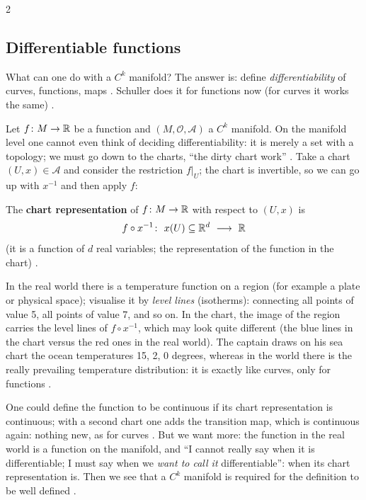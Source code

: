 \begin{paracol}{2}
\subsection{Differentiable functions}\label{ssec:dm-diff-fn}

What can one do with a $C^k$ manifold? The answer is: define \emph{differentiability} of curves, functions, maps
. Schuller does it for functions now (for curves it works the same)
.

Let $f\colon M\to\mathbb{R}$ be a function and $(M,\mathcal O,\mathcal A)$ a $C^k$ manifold. On the manifold level one cannot even
think of deciding differentiability: it is merely a set with a topology; we must go down to the charts, ``the dirty
chart work'' .
Take a chart $(U,x)\in\mathcal A$ and consider the restriction $f|_U$; the chart is invertible, so
we can go up with $x^{-1}$ and then apply $f$:

\begin{definition}\label{def:dm-fnrep}
The \textbf{chart representation} of $f\colon M\to\mathbb{R}$ with respect to $(U,x)$ is
\[
  f\circ x^{-1}\colon\ x(U)\subseteq\R^d\ \longrightarrow\ \R
\]
(it is a function of $d$ real variables; the representation of the function in the chart)
.
\end{definition}
\begin{intuition}
In the real world there is a temperature function on a region (for example a plate or physical space); visualise it by
\emph{level lines} (isotherms): connecting all points of value 5, all points of value 7, and so on. In the chart, the image of
the region carries the level lines of $f\circ x^{-1}$, which may look quite different (the blue lines in the chart versus
the red ones in the real world). The captain draws on his sea chart the ocean temperatures 15, 2, 0 degrees, whereas in the
world there is the really prevailing temperature distribution: it is exactly like curves, only for functions
.
\end{intuition}
One could define the function to be continuous if its chart representation is continuous; with a second chart one adds the
transition map, which is continuous again: nothing new, as for curves .
But we want more: the function in the real world is a function on the manifold, and ``I cannot really say when it is
differentiable; I must say when we \emph{want to call it} differentiable'': when its chart representation is. Then we see that
a $C^k$ manifold is required for the definition to be well defined .


\end{paracol}
